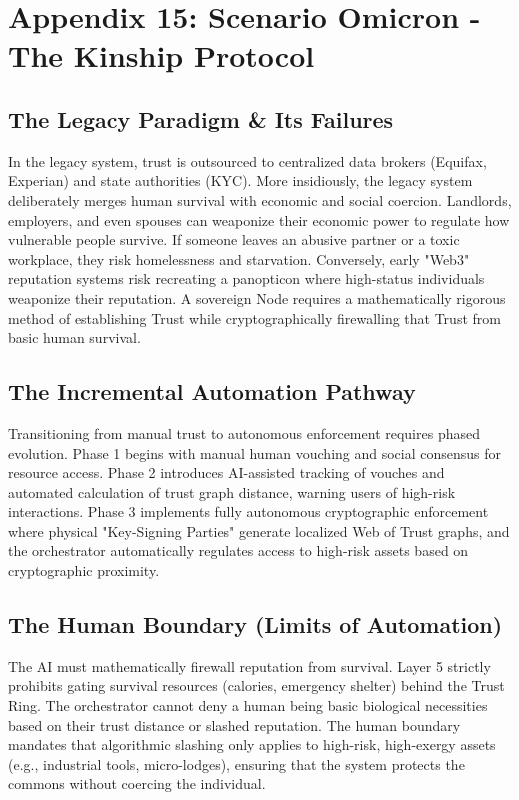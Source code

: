 \chapter{Appendix 15: Scenario Omicron - The Kinship Protocol}

\section{The Legacy Paradigm \& Its Failures}
In the legacy system, trust is outsourced to centralized data brokers (Equifax, Experian) and state authorities (KYC). More insidiously, the legacy system deliberately merges human survival with economic and social coercion. Landlords, employers, and even spouses can weaponize their economic power to regulate how vulnerable people survive. If someone leaves an abusive partner or a toxic workplace, they risk homelessness and starvation. Conversely, early "Web3" reputation systems risk recreating a panopticon where high-status individuals weaponize their reputation. A sovereign Node requires a mathematically rigorous method of establishing Trust while cryptographically firewalling that Trust from basic human survival.

\section{The Incremental Automation Pathway}
Transitioning from manual trust to autonomous enforcement requires phased evolution. Phase 1 begins with manual human vouching and social consensus for resource access. Phase 2 introduces AI-assisted tracking of vouches and automated calculation of trust graph distance, warning users of high-risk interactions. Phase 3 implements fully autonomous cryptographic enforcement where physical "Key-Signing Parties" generate localized Web of Trust graphs, and the orchestrator automatically regulates access to high-risk assets based on cryptographic proximity.

\section{The Human Boundary (Limits of Automation)}
The AI must mathematically firewall reputation from survival. Layer 5 strictly prohibits gating survival resources (calories, emergency shelter) behind the Trust Ring. The orchestrator cannot deny a human being basic biological necessities based on their trust distance or slashed reputation. The human boundary mandates that algorithmic slashing only applies to high-risk, high-exergy assets (e.g., industrial tools, micro-lodges), ensuring that the system protects the commons without coercing the individual.

